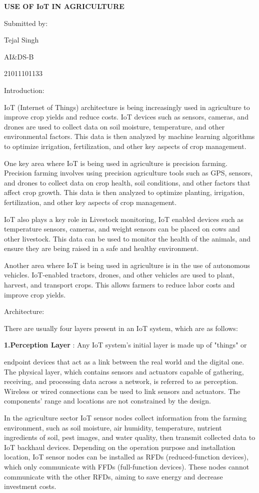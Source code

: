 \documentclass[
]{article}
\author{}
\date{}
\begin{document}
\textbf{USE OF IoT IN AGRICULTURE}

Submitted by:

Tejal Singh

AI\&DS-B

21011101133

Introduction:

IoT (Internet of Things) architecture is being increasingly used in
agriculture to improve crop yields and reduce costs. IoT devices such as
sensors, cameras, and drones are used to collect data on soil moisture,
temperature, and other environmental factors. This data is then analyzed
by machine learning algorithms to optimize irrigation, fertilization,
and other key aspects of crop management.

One key area where IoT is being used in agriculture is precision
farming. Precision farming involves using precision agriculture tools
such as GPS, sensors, and drones to collect data on crop health, soil
conditions, and other factors that affect crop growth. This data is then
analyzed to optimize planting, irrigation, fertilization, and other key
aspects of crop management.

IoT also plays a key role in Livestock monitoring, IoT enabled devices
such as temperature sensors, cameras, and weight sensors can be placed
on cows and other livestock. This data can be used to monitor the health
of the animals, and ensure they are being raised in a safe and healthy
environment.

Another area where IoT is being used in agriculture is in the use of
autonomous vehicles. IoT-enabled tractors, drones, and other vehicles
are used to plant, harvest, and transport crops. This allows farmers to
reduce labor costs and improve crop yields.

Architecture:

There are usually four layers present in an IoT system, which are as
follows:

\textbf{{1.Perception Layer}} : Any IoT system's initial layer is made
up of "things" or

endpoint devices that act as a link between the real world and the
digital one. The physical layer, which contains sensors and actuators
capable of gathering, receiving, and processing data across a network,
is referred to as perception. Wireless or wired connections can be used
to link sensors and actuators. The components' range and locations are
not constrained by the design.

In the agriculture sector IoT sensor nodes collect information from the
farming environment, such as soil moisture, air humidity, temperature,
nutrient ingredients of soil, pest images, and water quality, then
transmit collected data to IoT backhaul devices. Depending on the
operation purpose and installation location, IoT sensor nodes can be
installed as RFDs (reduced-function devices), which only communicate
with FFDs (full-function devices). These nodes cannot communicate with
the other RFDs, aiming to save energy and decrease investment costs.
\end{document}
